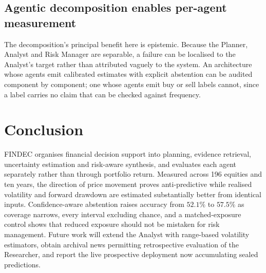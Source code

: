 \documentclass[conference]{IEEEtran}
\begin{document}
\subsection{Agentic decomposition enables per-agent measurement}
The decomposition's principal benefit here is epistemic. Because the Planner,
Analyst and Risk Manager are separable, a failure can be localised to the
Analyst's target rather than attributed vaguely to the system. An
architecture whose agents emit calibrated estimates with explicit abstention
can be audited component by component; one whose agents emit buy or sell
labels cannot, since a label carries no claim that can be checked against
frequency.

\section{Conclusion}
\label{sec:conclusion}
FINDEC organises financial decision support into planning, evidence
retrieval, uncertainty estimation and risk-aware synthesis, and evaluates
each agent separately rather than through portfolio return. Measured across
196 equities and ten years, the direction of price movement proves
anti-predictive while realised volatility and forward drawdown are estimated
substantially better from identical inputs. Confidence-aware abstention
raises accuracy from $52.1\%$ to $57.5\%$ as coverage narrows, every interval
excluding chance, and a matched-exposure control shows that reduced exposure
should not be mistaken for risk management. Future work will extend the
Analyst with range-based volatility estimators, obtain archival news
permitting retrospective evaluation of the Researcher, and report the live
prospective deployment now accumulating sealed predictions.



\end{document}
